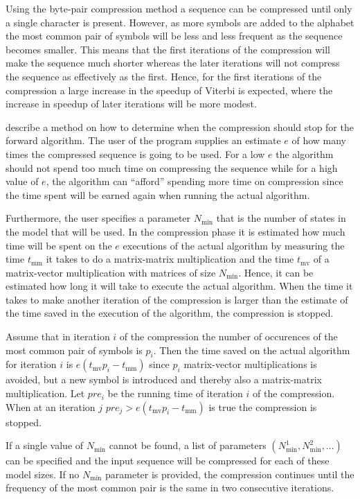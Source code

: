 Using the byte-pair compression method a sequence can be compressed until only
a single character is present. However, as more symbols are added to the
alphabet the most common pair of symbols will be less and less frequent as the
sequence becomes smaller. This means that the first iterations of the
compression will make the sequence much shorter whereas the later iterations
will not compress the sequence as effectively as the first. Hence, for the
first iterations of the compression a large increase in the speedup of Viterbi
is expected, where the increase in speedup of later iterations will be more
modest.

\citet{sand2013ziphmmlib} describe a method on how to determine when the
compression should stop for the forward algorithm. The user of the program
supplies an estimate $e$ of how many times the compressed sequence is going to
be used. For a low $e$ the algorithm should not spend too much time on
compressing the sequence while for a high value of $e$, the algorithm can
``afford'' spending more time on compression since the time spent will be
earned again when running the actual algorithm.

Furthermore, the user specifies a parameter $N_{\text{min}}$ that is the number
of states in the model that will be used. In the compression phase it is
estimated how much time will be spent on the $e$ executions of the actual
algorithm by measuring the time $t_{\text{mm}}$ it takes to do a matrix-matrix
multiplication and the time $t_{\text{mv}}$ of a matrix-vector multiplication
with matrices of size $N_{\text{min}}$. Hence, it can be estimated how long it
will take to execute the actual algorithm. When the time it takes to make
another iteration of the compression is larger than the estimate of the time
saved in the execution of the algorithm, the compression is stopped.

Assume that in iteration $i$ of the compression the number of occurences
of the most common pair of symbols is $p_i$. Then the time saved on the actual
algorithm for iteration $i$ is $e (t_{\text{mv}} p_i - t_{\text{mm}})$ since
$p_i$ matrix-vector multiplications is avoided, but a new symbol is introduced
and thereby also a matrix-matrix multiplication. Let $pre_i$ be the running
time of iteration $i$ of the compression. When at an iteration $j$
$pre_j > e (t_{\text{mv}} p_i - t_{\text{mm}})$ is true the compression is
stopped.

If a single value of
$N_{\text{min}}$ cannot be found, a list of parameters
$(N_{\text{min}}^1, N_{\text{min}}^2, \dots)$ can be specified and the input
sequence will be compressed for each of these model sizes. If no
$N_{\text{min}}$ parameter is provided, the compression continues until the
frequency of the most common pair is the same in two consecutive iterations.

